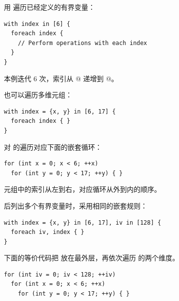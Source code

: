用 \co@foreach@ 遍历已经定义的有界变量：

\begin{lstlisting}[language=croqtile,caption={索引一个形状}]
with index in [6] {
  foreach index {
    // Perform operations with each index
  }
}
\end{lstlisting}

本例迭代 6 次，索引从 @ 递增到 @。

也可以遍历多维元组：

\begin{lstlisting}[language=croqtile,caption={索引元组}]
with index = {x, y} in [6, 17] {
  foreach index { }
}
\end{lstlisting}

对 \co@index@ 的遍历对应下面的嵌套循环：

\begin{lstlisting}[language=croqtile,caption={生成的 C++ 循环}]
for (int x = 0; x < 6; ++x)
  for (int y = 0; y < 17; ++y) { }
\end{lstlisting}

元组中的索引从左到右，对应循环从外到内的顺序。

\co@foreach@ 后列出多个有界变量时，采用相同的嵌套规则：

\begin{lstlisting}[language=croqtile,caption={若干有界组}]
with index = {x, y} in [6, 17], iv in [128] {
  foreach iv, index { }
}
\end{lstlisting}

下面的等价代码把 \co@iv@ 放在最外层，再依次遍历 \co@index@ 的两个维度。

\begin{lstlisting}[language=croqtile,caption={生成的内层循环}]
for (int iv = 0; iv < 128; ++iv)
  for (int x = 0; x < 6; ++x)
    for (int y = 0; y < 17; ++y) { }
\end{lstlisting}
